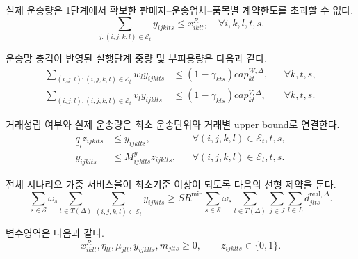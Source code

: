 \documentclass[11pt,a4paper]{article}
\newcommand{\Scen}{\mathcal{S}}
\newcommand{\Eset}{\mathcal{E}}
\begin{document}
실제 운송량은 1단계에서 확보한 판매자--운송업체--품목별 계약한도를 초과할 수 없다.
\begin{equation}
\sum_{j:(i,j,k,l)\in\Eset_t}y_{ijklts}
\le x^R_{iklt},
\quad \forall i,k,l,t,s.
\label{eq:contract-use}
\end{equation}

운송망 충격이 반영된 실행단계 중량 및 부피용량은 다음과 같다.
\begin{align}
\sum_{(i,j,l):(i,j,k,l)\in\Eset_t}w_ly_{ijklts}
&\le (1-\gamma_{kts})cap^{W,\Delta}_{kt},
&&\forall k,t,s, \label{eq:run-weight}\\
\sum_{(i,j,l):(i,j,k,l)\in\Eset_t}v_ly_{ijklts}
&\le (1-\gamma_{kts})cap^{V,\Delta}_{kt},
&&\forall k,t,s. \label{eq:run-volume}
\end{align}

거래성립 여부와 실제 운송량은 최소 운송단위와 거래별 upper bound로 연결한다.
\begin{align}
\underline q_l z_{ijklts}
&\le y_{ijklts},
&&\forall (i,j,k,l)\in\Eset_t,t,s, \label{eq:min-lot}\\
y_{ijklts}
&\le M^y_{ijklts}z_{ijklts},
&&\forall (i,j,k,l)\in\Eset_t,t,s. \label{eq:bigM}
\end{align}

전체 시나리오 가중 서비스율이 최소기준 이상이 되도록 다음의 선형 제약을 둔다.
\begin{equation}
\sum_{s\in\Scen}\omega_s
\sum_{t\in T(\Delta)}\sum_{(i,j,k,l)\in\Eset_t}y_{ijklts}
\ge SR^{\min}
\sum_{s\in\Scen}\omega_s
\sum_{t\in T(\Delta)}\sum_{j\in J}\sum_{l\in L}d^{\mathrm{real},\Delta}_{jlts}.
\label{eq:service}
\end{equation}

변수영역은 다음과 같다.
\begin{equation}
x^R_{iklt},\eta_{lt},\mu_{jlt},y_{ijklts},m_{jlts}\ge0,
\qquad z_{ijklts}\in\{0,1\}.
\label{eq:domain}
\end{equation}
\end{document}
